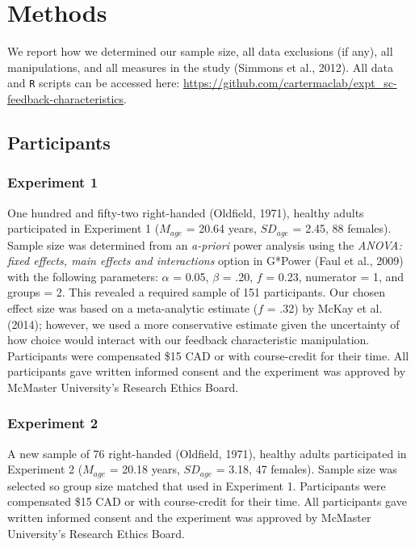 \documentclass[
  doc, donotrepeattitle,floatsintext]{apa7}
\begin{document}
\hypertarget{methods}{%
\section{Methods}\label{methods}}

We report how we determined our sample size, all data exclusions (if any), all manipulations, and all measures in the study (Simmons et al., 2012). All data and \texttt{R} scripts can be accessed here: \url{https://github.com/cartermaclab/expt_sc-feedback-characteristics}.

\hypertarget{participants}{%
\subsection{Participants}\label{participants}}

\hypertarget{experiment-1}{%
\subsubsection{Experiment 1}\label{experiment-1}}

One hundred and fifty-two right-handed (Oldfield, 1971), healthy adults participated in Experiment 1 (\(M_{age}\) = 20.64 years, \(SD_{age}\) = 2.45, 88 females). Sample size was determined from an \emph{a-priori} power analysis using the \emph{ANOVA: fixed effects, main effects and interactions} option in G*Power (Faul et al., 2009) with the following parameters: \(\alpha\) = 0.05, \(\beta\) = .20, \(f\) = 0.23, numerator = 1, and groups = 2. This revealed a required sample of 151 participants. Our chosen effect size was based on a meta-analytic estimate (\(f\) = .32) by McKay et al. (2014); however, we used a more conservative estimate given the uncertainty of how choice would interact with our feedback characteristic manipulation. Participants were compensated \$15 CAD or with course-credit for their time. All participants gave written informed consent and the experiment was approved by McMaster University's Research Ethics Board.

\hypertarget{experiment-2}{%
\subsubsection{Experiment 2}\label{experiment-2}}

A new sample of 76 right-handed (Oldfield, 1971), healthy adults participated in Experiment 2 (\(M_{age}\) = 20.18 years, \(SD_{age}\) = 3.18, 47 females). Sample size was selected so group size matched that used in Experiment 1. Participants were compensated \$15 CAD or with course-credit for their time. All participants gave written informed consent and the experiment was approved by McMaster University's Research Ethics Board.
\end{document}
